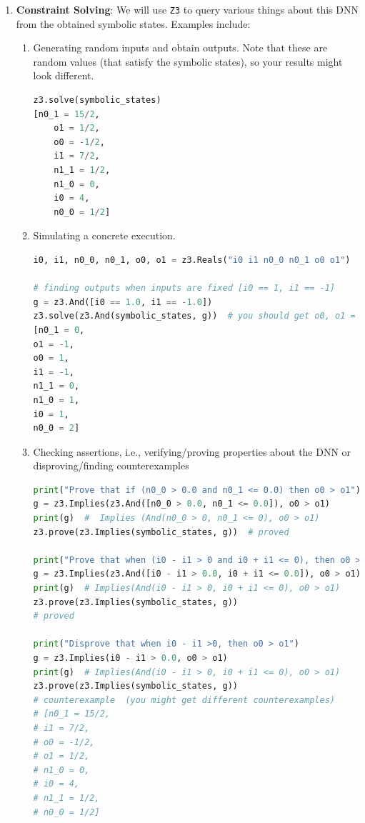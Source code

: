 \documentclass[oneside,11pt,dvipsnames]{book}
\numberwithin{equation}{section}
\theoremstyle{definition}
\theoremstyle{remark}
\begin{document}
\begin{enumerate}[label=\arabic*.]
\item \textbf{Constraint Solving}: We will use \texttt{Z3} to query various things about this DNN from the obtained symbolic states. Examples include:

\begin{enumerate}[label=(\alph*)]
\item Generating random inputs and obtain outputs.  Note that these are random values (that satisfy the symbolic states), so your results might look different.

\begin{lstlisting}[language=Python]
z3.solve(symbolic_states)
[n0_1 = 15/2,
    o1 = 1/2,
    o0 = -1/2,
    i1 = 7/2,
    n1_1 = 1/2,
    n1_0 = 0,
    i0 = 4,
    n0_0 = 1/2]
\end{lstlisting}

\item Simulating a concrete execution. 

\begin{lstlisting}[language=Python]
i0, i1, n0_0, n0_1, o0, o1 = z3.Reals("i0 i1 n0_0 n0_1 o0 o1")

# finding outputs when inputs are fixed [i0 == 1, i1 == -1]
g = z3.And([i0 == 1.0, i1 == -1.0])
z3.solve(z3.And(symbolic_states, g))  # you should get o0, o1 = 1, -1
[n0_1 = 0,
o1 = -1,
o0 = 1,
i1 = -1,
n1_1 = 0,
n1_0 = 1,
i0 = 1,
n0_0 = 2]
\end{lstlisting}

\item Checking assertions, i.e., verifying/proving properties about the DNN or disproving/finding counterexamples

\begin{lstlisting}[language=Python]
print("Prove that if (n0_0 > 0.0 and n0_1 <= 0.0) then o0 > o1")
g = z3.Implies(z3.And([n0_0 > 0.0, n0_1 <= 0.0]), o0 > o1)
print(g)  #  Implies (And(n0_0 > 0, n0_1 <= 0), o0 > o1)
z3.prove(z3.Implies(symbolic_states, g))  # proved

print("Prove that when (i0 - i1 > 0 and i0 + i1 <= 0), then o0 > o1")
g = z3.Implies(z3.And([i0 - i1 > 0.0, i0 + i1 <= 0.0]), o0 > o1)
print(g)  # Implies(And(i0 - i1 > 0, i0 + i1 <= 0), o0 > o1)
z3.prove(z3.Implies(symbolic_states, g))
# proved

print("Disprove that when i0 - i1 >0, then o0 > o1")
g = z3.Implies(i0 - i1 > 0.0, o0 > o1)
print(g)  # Implies(And(i0 - i1 > 0, i0 + i1 <= 0), o0 > o1)
z3.prove(z3.Implies(symbolic_states, g))
# counterexample  (you might get different counterexamples)
# [n0_1 = 15/2,
# i1 = 7/2,
# o0 = -1/2,
# o1 = 1/2,
# n1_0 = 0,
# i0 = 4,
# n1_1 = 1/2,
# n0_0 = 1/2]
\end{lstlisting}
\end{enumerate}
\end{enumerate}
\end{document}
